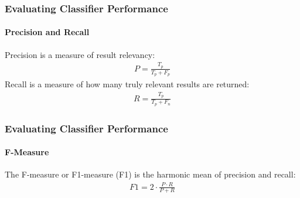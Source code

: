 \documentclass{beamer}
\begin{document}
\begin{frame}[noframenumbering]
    \frametitle{Evaluating Classifier Performance}  %
    \framesubtitle{Precision and Recall}
    Precision is a measure of result relevancy:
    \begin{equation}
    \label{eq:precision}
    \begin{aligned}
    P = \frac{T_p}{T_p+F_p}
    \end{aligned}
    \end{equation}
    Recall is a measure of how many truly relevant results are returned:
    \begin{equation}
    \label{eq:recall}
    \begin{aligned}
    R = \frac{T_p}{T_p+F_n}
    \end{aligned}
    \end{equation}
\end{frame}
\begin{frame}[noframenumbering]
    \frametitle{Evaluating Classifier Performance}  %
    \framesubtitle{F-Measure}
    The F-measure or F1-measure (F1) is the harmonic mean of precision and recall:
    \begin{equation}
    \label{eq:fmes}
    \begin{aligned}
    F1 = 2\cdot \frac{P \cdot R}{P+R}
    \end{aligned}
    \end{equation}
\end{frame}
\end{document}
